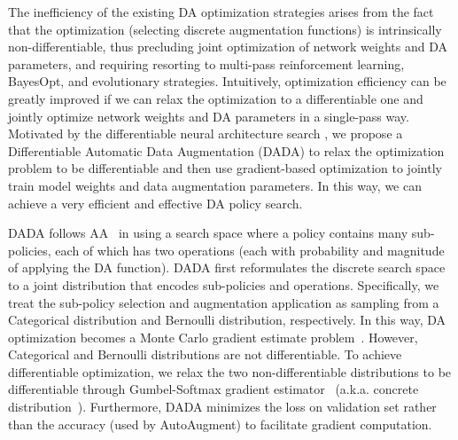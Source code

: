 \documentclass[runningheads]{llncs}
\begin{document}
The inefficiency of the existing DA optimization strategies arises from the fact that the optimization {(selecting discrete augmentation functions)} is intrinsically non-differentiable, thus precluding joint optimization of network weights and DA parameters, and requiring resorting to multi-pass reinforcement learning, BayesOpt, and evolutionary strategies. 
Intuitively, optimization efficiency can be greatly improved if we can relax the optimization to a differentiable one and jointly optimize network weights and DA parameters in a single-pass way. Motivated by the differentiable neural architecture search \cite{DBLP:conf/iclr/LiuSY19,DBLP:conf/iclr/XieZLL19,Dong_2019_CVPR}, we propose a Differentiable Automatic Data Augmentation (DADA) to relax the optimization problem to be differentiable and then use gradient-based optimization to jointly train model weights and data augmentation parameters. In this way, we can achieve a very efficient and effective DA policy search.



DADA follows AA~\cite{DBLP:conf/cvpr/CubukZMVL19} in using a search space where a policy contains many sub-policies, each of which has two operations (each with probability and magnitude of applying the DA function).  DADA first reformulates the discrete search space to a joint distribution that encodes sub-policies and operations. Specifically, we treat the sub-policy selection and augmentation application as sampling from a Categorical distribution and Bernoulli distribution, respectively. In this way,  DA  optimization becomes a Monte Carlo gradient estimate problem~\cite{DBLP:journals/corr/abs-1906-10652}. However, Categorical and Bernoulli distributions are not differentiable. To achieve differentiable optimization, we relax the two non-differentiable distributions to be differentiable through Gumbel-Softmax gradient estimator~\cite{DBLP:conf/iclr/JangGP17} (a.k.a. concrete distribution~\cite{DBLP:conf/iclr/MaddisonMT17}). Furthermore, DADA minimizes the loss on validation set rather than the accuracy (used by AutoAugment) to facilitate gradient computation.
\end{document}
